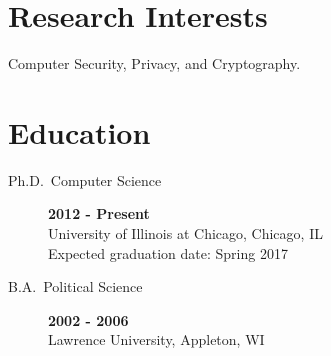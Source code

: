 \documentclass{vitae}
\author{Peter Snyder}
\begin{document}
  \maketitle

  \section{Research Interests}
  \begin{description}
    \item{Computer Security, Privacy, and Cryptography.}
  \end{description}

  \section{Education}
  \begin{description}
    \item[Ph.D.~Computer Science] \hfill \textbf{2012 - Present}\\
    University of Illinois at Chicago, Chicago, IL\\
    Expected graduation date: Spring 2017

    \item[B.A.~Political Science] \hfill \textbf{2002 - 2006}~\\
    Lawrence University, Appleton, WI
  \end{description}

  
    \nocite{cschi}
    \nocite{cscodaspy}
    \nocite{csgcasr}
    \nocite{snyder2013cloudsweeper}
  
\end{document}
